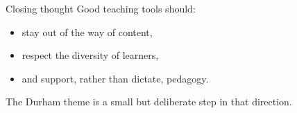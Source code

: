 \documentclass[aspectratio=169]{beamer}
\begin{document}
\begin{frame}{Closing thought}
Good teaching tools should:
\begin{itemize}
  \item stay out of the way of content,
  \item respect the diversity of learners,
  \item and support, rather than dictate, pedagogy.
\end{itemize}

\vspace{0.8em}
The Durham theme is a small but deliberate step in that direction.
\end{frame}

\makethankyou
\end{document}
